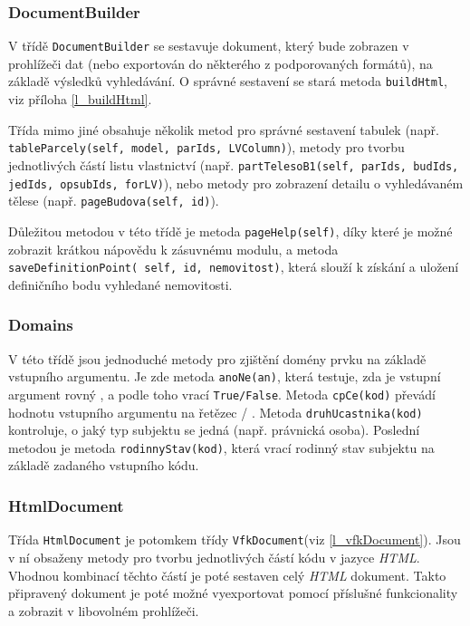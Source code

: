 \documentclass[a4paper,12pt,oneside]{book}
\begin{document}
\subsubsection{DocumentBuilder}
V třídě \texttt{DocumentBuilder} se sestavuje dokument, který bude zobrazen v prohlížeči dat (nebo exportován do některého z podporovaných formátů), na základě výsledků vyhledávání. O správné sestavení se stará metoda \texttt{buildHtml}, viz příloha \ref{l_buildHtml}. 

Třída mimo jiné obsahuje několik metod pro správné sestavení tabulek (např. \texttt{tableParcely(self, model, parIds, LVColumn)}), metody pro tvorbu jednotlivých částí listu vlastnictví (např. \texttt{partTelesoB1(self, parIds, budIds, jedIds, opsubIds, forLV)}), nebo metody pro zobrazení detailu o vyhledávaném tělese (např. \texttt{pageBudova(self, id)}).

Důležitou metodou v této třídě je metoda \texttt{pageHelp(self)}, díky které je možné zobrazit krátkou nápovědu k zásuvnému modulu, a metoda \texttt{saveDefinitionPoint( self, id, nemovitost)}, která slouží k získání a uložení definičního bodu vyhledané nemovitosti.

\subsubsection{Domains}
V této třídě jsou jednoduché metody pro zjištění domény prvku na základě vstupního argumentu. Je zde metoda \texttt{anoNe(an)}, která testuje, zda je vstupní argument rovný , a podle toho vrací \texttt{True/False}. Metoda \texttt{cpCe(kod)} převádí hodnotu vstupního argumentu na řetězec  / . Metoda \texttt{druhUcastnika(kod)} kontroluje, o jaký typ subjektu se jedná (např. právnická osoba). Poslední metodou je metoda \texttt{rodinnyStav(kod)}, která vrací rodinný stav subjektu na základě zadaného vstupního kódu.

\subsubsection{HtmlDocument}
Třída \texttt{HtmlDocument} je potomkem třídy \texttt{VfkDocument}(viz \ref{l_vfkDocument}). Jsou v ní obsaženy metody pro tvorbu jednotlivých částí kódu v jazyce \textit{HTML}. Vhodnou kombinací těchto částí je poté sestaven celý \textit{HTML} dokument. Takto připravený dokument je poté možné vyexportovat pomocí příslušné funkcionality a zobrazit v libovolném prohlížeči.
\end{document}

